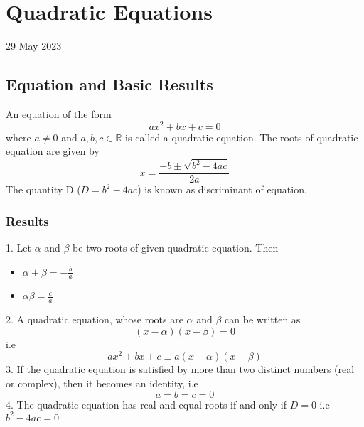 \documentclass[twocolumn, 10pt]{article}
\begin{document}
\section{Quadratic Equations}
29 May 2023
\subsection{Equation and Basic Results}
An equation of the form $$ax^2+bx+c=0$$ where $a \not= 0$ and $a,b,c \in \mathbb{R}$ is called a quadratic equation. The roots of quadratic equation are given by $$x=\frac{-b \pm \sqrt{b^2-4ac}}{2a}$$ The quantity D ($D=b^2-4ac$) is known as discriminant of equation.
\subsubsection{Results}
1. Let $\alpha$ and $\beta$ be two roots of given quadratic equation. Then

\begin{itemize}
\item $\alpha + \beta = -\frac{b}{a}$
\item $\alpha \beta=\frac{c}{a}$
\end{itemize}
2. A quadratic equation, whose roots are $\alpha$ and $\beta$ can be written as $$(x-\alpha)(x-\beta)=0$$ i.e $$ax^2+bx+c \equiv a(x-\alpha)(x-\beta)$$
3. If the quadratic equation is satisfied by more than two distinct numbers (real or complex), then it becomes an identity, i.e $$a=b=c=0$$
4. The quadratic equation has real and equal roots if and only if $D=0$ i.e $b^2-4ac=0$
\end{document}
